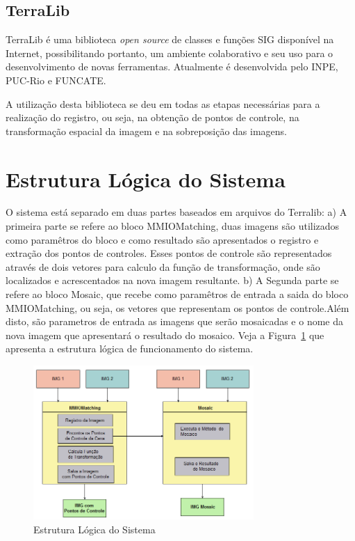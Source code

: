 \documentclass[9pt, a4paper, nofonttune, journal]{IEEEtran}
\begin{document}
\subsection{TerraLib}
TerraLib é uma biblioteca \textit{open source} de classes e funções SIG disponível na Internet, possibilitando portanto, um ambiente colaborativo e seu uso
para o desenvolvimento de novas ferramentas. Atualmente é desenvolvida pelo INPE, PUC-Rio e FUNCATE.\cite{Terralib1}

A utilização desta biblioteca se deu em todas as etapas necessárias para a realização do registro, ou seja, na obtenção de pontos de controle,
na transformação espacial da imagem e na sobreposição das imagens.

\section{ Estrutura Lógica do Sistema }
 
O sistema está separado em duas partes baseados em arquivos do Terralib: a) A primeira parte se refere ao bloco MMIOMatching, duas imagens são utilizados como paramêtros do bloco e como resultado são apresentados o registro e extração dos pontos de controles. Esses pontos de controle são representados através de dois vetores para calculo da função de transformação, onde são localizados e acrescentados na nova imagem resultante.
b) A Segunda parte se refere ao bloco Mosaic, que recebe como paramêtros de entrada a saida do bloco MMIOMatching, ou seja, os vetores  que representam os pontos de controle.Além disto, são parametros de entrada as imagens que serão mosaicadas e o nome da nova imagem que apresentará o resultado do mosaico.
Veja a Figura~\ref{fig:estrutura_logica} que apresenta a estrutura lógica de funcionamento do sistema.

\begin{figure}[h!t]
  \centering
  \includegraphics[width=3.3in]{figuras/estrutura_logica}
  \caption{Estrutura Lógica do Sistema}
  \label{fig:estrutura_logica}
\end{figure}
\end{document}
